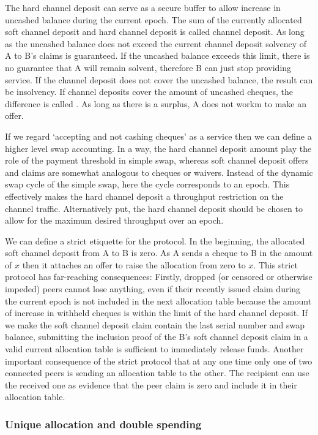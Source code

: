 The hard channel deposit can serve as a secure buffer to allow increase in uncashed balance during the current epoch.
The sum of the currently allocated soft channel deposit and hard channel deposit is called channel deposit.
As long as the uncashed balance does not exceed the current channel deposit solvency of A to B's claims is guaranteed. If the uncashed balance exceeds this limit, there is no guarantee that A will remain solvent, therefore B can just stop providing service. If the channel deposit  does not cover the uncashed balance, the result can be insolvency. If channel deposits cover the amount of uncashed cheques, the difference is called . As long as there is a surplus, A does not workm to make an offer.

If we regard `accepting and not cashing cheques' as a service then we can define a higher level swap accounting. In a way, the hard channel deposit amount play the role of the payment  threshold in simple swap, whereas soft channel deposit offers and claims are somewhat analogous to cheques or waivers.
Instead of the dynamic swap cycle of the simple swap, here the cycle corresponds to an epoch. This effectively makes the hard channel deposit a throughput restriction on the channel traffic. Alternatively put, the hard channel deposit should  be chosen to allow for the maximum desired throughput over an epoch. 

We can define a strict etiquette for the protocol. In the beginning, the allocated soft channel deposit from A to B is zero. As A sends a cheque to B in the amount of $x$ then it attaches an offer to raise the allocation from zero to $x$. This strict protocol has far-reaching consequences: Firstly, dropped (or censored or otherwise impeded) peers cannot lose anything, even if their recently issued claim during the current epoch is not included in the next allocation table because the amount of increase in withheld cheques is within the limit of the hard channel deposit. 
If we make the soft channel deposit claim contain the last serial number and swap balance, submitting the inclusion proof of the B's soft channel deposit claim in a valid current allocation table is sufficient to immediately release funds. 
Another important consequence of the strict protocol that at any one time only one of two connected peers is sending an allocation table to the other. The recipient can use the received one as evidence that the peer claim is zero and include it in their allocation table. 

\subsubsection{Unique allocation and double spending}

